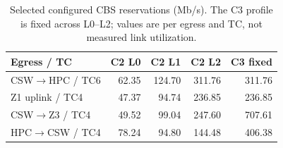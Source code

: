 \begin{table}[t]
\centering
\caption{Selected configured CBS reservations (Mb/s). The C3 profile is fixed across L0--L2; values are per egress and TC, not measured link utilization.}
\label{tab:reservations}
\footnotesize
\setlength{\tabcolsep}{3pt}
\begin{tabular}{@{}lrrrr@{}}
\toprule
Egress / TC & C2 L0 & C2 L1 & C2 L2 & C3 fixed \\
\midrule
CSW$\rightarrow$HPC / TC6 & 62.35 & 124.70 & 311.76 & 311.76 \\
Z1 uplink / TC4 & 47.37 & 94.74 & 236.85 & 236.85 \\
CSW$\rightarrow$Z3 / TC4 & 49.52 & 99.04 & 247.60 & 707.61 \\
HPC$\rightarrow$CSW / TC4 & 78.24 & 94.80 & 144.48 & 406.38 \\
\bottomrule
\end{tabular}
\end{table}
